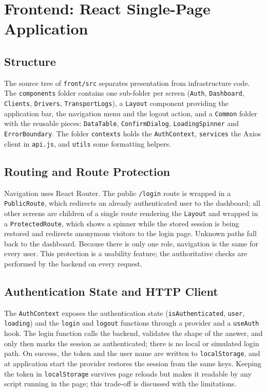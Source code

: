 \section{Frontend: React Single-Page Application}
\label{sec:impl-front}

\subsection{Structure}

The source tree of \texttt{front/src} separates presentation from infrastructure code. The \texttt{components} folder contains one sub-folder per screen (\texttt{Auth}, \texttt{Dashboard}, \texttt{Clients}, \texttt{Drivers}, \texttt{TransportLogs}), a \texttt{Layout} component providing the application bar, the navigation menu and the logout action, and a \texttt{Common} folder with the reusable pieces: \texttt{DataTable}, \texttt{ConfirmDialog}, \texttt{LoadingSpinner} and \texttt{ErrorBoundary}. The folder \texttt{contexts} holds the \texttt{AuthContext}, \texttt{services} the Axios client in \texttt{api.js}, and \texttt{utils} some formatting helpers.

\subsection{Routing and Route Protection}

Navigation uses React Router. The public \texttt{/login} route is wrapped in a \texttt{PublicRoute}, which redirects an already authenticated user to the dashboard; all other screens are children of a single route rendering the \texttt{Layout} and wrapped in a \texttt{ProtectedRoute}, which shows a spinner while the stored session is being restored and redirects anonymous visitors to the login page. Unknown paths fall back to the dashboard. Because there is only one role, navigation is the same for every user. This protection is a usability feature; the authoritative checks are performed by the backend on every request.


\subsection{Authentication State and HTTP Client}

The \texttt{AuthContext} exposes the authentication state (\texttt{isAuthenticated}, \texttt{user}, \texttt{loading}) and the \texttt{login} and \texttt{logout} functions through a provider and a \texttt{useAuth} hook. The login function calls the backend, validates the shape of the answer, and only then marks the session as authenticated; there is no local or simulated login path. On success, the token and the user name are written to \texttt{localStorage}, and at application start the provider restores the session from the same keys. Keeping the token in \texttt{localStorage} survives page reloads but makes it readable by any script running in the page; this trade-off is discussed with the limitations.

